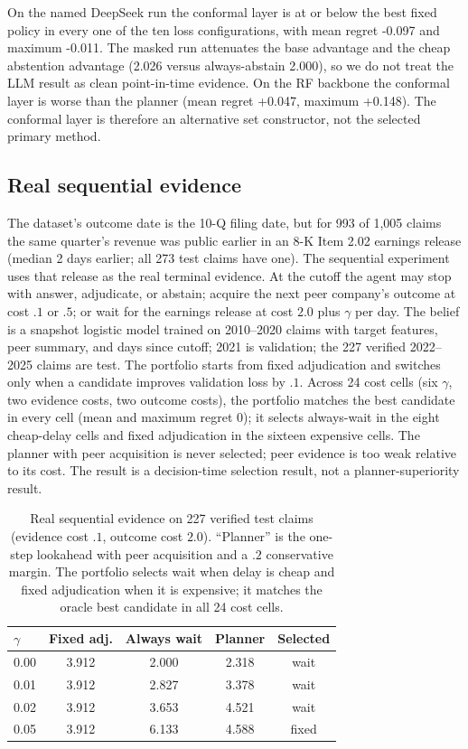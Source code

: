 \documentclass[11pt]{article}
\begin{document}
On the named DeepSeek run the conformal layer is at or below the best fixed
policy in every one of the ten loss configurations, with mean regret -0.097
and maximum -0.011. The masked run attenuates the base advantage and the cheap
abstention advantage (2.026 versus always-abstain 2.000), so we do not treat
the LLM result as clean point-in-time evidence. On the RF backbone the
conformal layer is worse than the planner (mean regret +0.047, maximum +0.148).
The conformal layer is therefore an alternative set constructor, not the
selected primary method.


\subsection{Real sequential evidence}
\label{app:sequential}
The dataset's outcome date is the 10-Q filing date, but for 993 of 1,005
claims the same quarter's revenue was public earlier in an 8-K Item 2.02
earnings release (median 2 days earlier; all 273 test claims have one). The
sequential experiment uses that release as the real terminal evidence. At the
cutoff the agent may stop with answer, adjudicate, or abstain; acquire the next
peer company's outcome at cost $.1$ or $.5$; or wait for the earnings release
at cost $2.0$ plus $\gamma$ per day. The belief is a snapshot logistic model
trained on 2010--2020 claims with target features, peer summary, and days since
cutoff; 2021 is validation; the 227 verified 2022--2025 claims are test. The
portfolio starts from fixed adjudication and switches only when a candidate
improves validation loss by $.1$. Across 24 cost cells (six $\gamma$, two
evidence costs, two outcome costs), the portfolio matches the best candidate in
every cell (mean and maximum regret 0); it selects always-wait in the eight
cheap-delay cells and fixed adjudication in the sixteen expensive cells. The
planner with peer acquisition is never selected; peer evidence is too weak
relative to its cost. The result is a decision-time selection result, not a
planner-superiority result.

\begin{table}[t]
\centering
\small
\setlength{\tabcolsep}{3pt}
\begin{tabular}{lcccc}
\toprule
$\gamma$ & Fixed adj. & Always wait & Planner & Selected \\
\midrule
0.00 & 3.912 & 2.000 & 2.318 & wait \\
0.01 & 3.912 & 2.827 & 3.378 & wait \\
0.02 & 3.912 & 3.653 & 4.521 & wait \\
0.05 & 3.912 & 6.133 & 4.588 & fixed \\
\bottomrule
\end{tabular}
\caption{Real sequential evidence on 227 verified test claims (evidence cost
$.1$, outcome cost $2.0$). ``Planner'' is the one-step lookahead with peer
acquisition and a $.2$ conservative margin. The portfolio selects wait when
delay is cheap and fixed adjudication when it is expensive; it matches the
oracle best candidate in all 24 cost cells.}
\label{tab:sequential}
\end{table}
\end{document}
